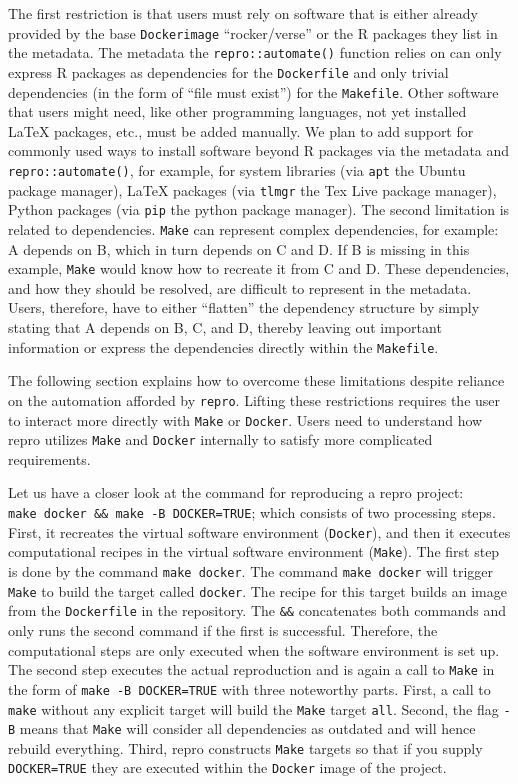 \documentclass[psych,tutorial,accept,moreauthors,pdftex]{Definitions/mdpi}
\begin{document}
\begin{paracol}{2}
The first restriction is that users must rely on software that is either
already provided by the base \texttt{Dockerimage} ``rocker/verse'' or
the R packages they list in the metadata. The metadata the
\texttt{repro::automate()} function relies on can only express R
packages as dependencies for the \texttt{Dockerfile} and only trivial
dependencies (in the form of ``file must exist'') for the
\texttt{Makefile}. Other software that users might need, like other
programming languages, not yet installed LaTeX packages, etc., must be
added manually. We plan to add support for commonly used ways to install
software beyond R packages via the metadata and
\texttt{repro::automate()}, for example, for system libraries (via
\texttt{apt} the Ubuntu package manager), LaTeX packages (via
\texttt{tlmgr} the Tex Live package manager), Python packages (via
\texttt{pip} the python package manager). The second limitation is
related to dependencies. \texttt{Make} can represent complex
dependencies, for example: A depends on B, which in turn depends on C
and D. If B is missing in this example, \texttt{Make} would know how to
recreate it from C and D. These dependencies, and how they should be
resolved, are difficult to represent in the metadata. Users, therefore,
have to either ``flatten'' the dependency structure by simply stating
that A depends on B, C, and D, thereby leaving out important information
or express the dependencies directly within the \texttt{Makefile}.

The following section explains how to overcome these limitations despite
reliance on the automation afforded by \texttt{repro}. Lifting these
restrictions requires the user to interact more directly with
\texttt{Make} or \texttt{Docker}. Users need to understand how repro
utilizes \texttt{Make} and \texttt{Docker} internally to satisfy more
complicated requirements.

Let us have a closer look at the command for reproducing a repro
project: \texttt{make\ docker\ \&\&\ make\ -B\ DOCKER=TRUE}; which
consists of two processing steps. First, it recreates the virtual
software environment (\texttt{Docker}), and then it executes
computational recipes in the virtual software environment
(\texttt{Make}). The first step is done by the command
\texttt{make\ docker}. The command \texttt{make\ docker} will trigger
\texttt{Make} to build the target called \texttt{docker}. The recipe for
this target builds an image from the \texttt{Dockerfile} in the
repository. The \texttt{\&\&} concatenates both commands and only runs
the second command if the first is successful. Therefore, the
computational steps are only executed when the software environment is
set up. The second step executes the actual reproduction and is again a
call to \texttt{Make} in the form of \texttt{make\ -B\ DOCKER=TRUE} with
three noteworthy parts. First, a call to \texttt{make} without any
explicit target will build the \texttt{Make} target \texttt{all}.
Second, the flag \texttt{-B} means that \texttt{Make} will consider all
dependencies as outdated and will hence rebuild everything. Third, repro
constructs \texttt{Make} targets so that if you supply
\texttt{DOCKER=TRUE} they are executed within the \texttt{Docker} image
of the project.


\end{paracol}
\end{document}

